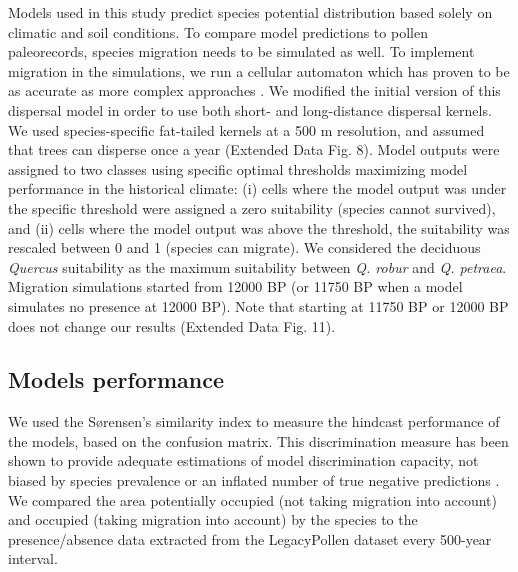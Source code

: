 \documentclass[pdflatex, sn-nature]{sn-jnl}%
\begin{document}
Models used in this study predict species potential distribution based solely on climatic and soil conditions. To compare model predictions to pollen paleorecords, species migration needs to be simulated as well. To implement migration in the simulations, we run a  cellular automaton \cite{Engler2012} which has proven to be as accurate as more complex approaches \cite{Zurell2016}. We modified the initial version of this dispersal model in order to use both short- and long-distance dispersal kernels. We used species-specific fat-tailed kernels \cite{Zani2022} at a 500 m resolution, and assumed that trees can disperse once a year (Extended Data Fig. 8). Model outputs were assigned to two classes using specific optimal thresholds maximizing model performance in the historical climate: (i) cells where the model output was under the specific threshold were assigned a zero suitability (species cannot survived), and (ii) cells where the  model output was above the threshold, the suitability was rescaled between 0 and 1 (species can migrate). We considered the deciduous \emph{Quercus} suitability as the maximum suitability between \emph{Q. robur} and \emph{Q. petraea}. Migration simulations started from 12000 BP (or 11750 BP when a model simulates no presence at 12000 BP). Note that starting at 11750 BP or 12000 BP does not change our results (Extended Data Fig. 11).

\subsection{Models performance}\label{skill}

We used the Sørensen's similarity index to measure the hindcast performance of the models, based on the confusion matrix. This discrimination measure has been shown to provide adequate estimations of model discrimination capacity,  not biased by species prevalence or an inflated number of true negative predictions \cite{Leroy2018}. We compared the area potentially occupied (not taking migration into account) and occupied (taking migration into account) by the species to the presence/absence data extracted from the LegacyPollen dataset every 500-year interval.
\end{document}
